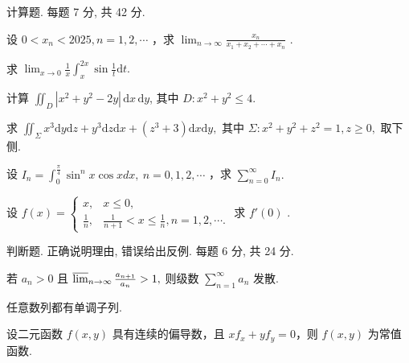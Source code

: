\par{}
计算题. 每题 7 分, 共 42 分.\par
设  $0 < x_{n} < 2025, n = 1, 2, \cdots$ ，求  $\lim_{n \to \infty} \frac{x_{n}}{x_{1} + x_{2} + \cdots + x_{n}}$ .\par
求 $\lim_{x\to 0}\frac{1}{x}\int_{x}^{2x}\sin \frac{1}{t}\mathrm{d}t.$\par
计算 $\iint_{D} |x^{2} + y^{2} - 2y| \, \mathrm{d}x \, \mathrm{d}y$, 其中 $D: x^{2} + y^{2} \leq 4$.\par
求 $\iint_{\Sigma} x^{3} \mathrm{d}y \mathrm{d}z + y^{3} \mathrm{d}z \mathrm{d}x + (z^{3} + 3) \mathrm{d}x \mathrm{d}y,$ 其中 $\Sigma: x^{2} + y^{2} + z^{2} = 1, z \geq 0,$ 取下侧.\par
设  $I_{n}=\int_{0}^{\frac{\pi}{4}}\sin^{n}x\cos x dx,\ n=0,1,2,\cdots$ ，求  $\sum_{n=0}^{\infty}I_{n}.$\par
设  $f(x)=\left\{\begin{aligned}x,&x\leq0,\\ \frac{1}{n},&\frac{1}{n+1}<x\leq\frac{1}{n},n=1,2,\cdots.\end{aligned}\right.$  求  $f'(0)$ .\par
\par{}
判断题. 正确说明理由, 错误给出反例. 每题 6 分, 共 24 分.\par
若 $a_{n} > 0$ 且 $\varlimsup_{n\to \infty}\frac{a_{n + 1}}{a_n} >1,$ 则级数 $\sum_{n = 1}^{\infty}a_n$ 发散.\par
任意数列都有单调子列.\par
设二元函数 $f(x, y)$ 具有连续的偏导数，且 $xf_x + yf_y = 0$，则 $f(x, y)$ 为常值函数.\par
